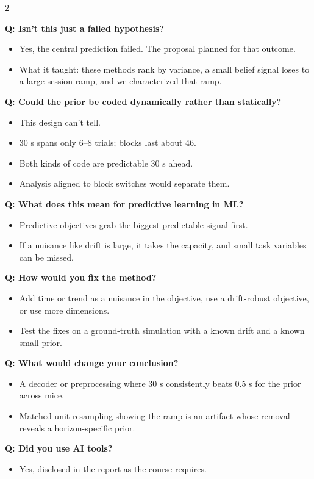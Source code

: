 \documentclass[10pt]{article}
\newcommand{\q}[2]{\par\smallskip\noindent\begin{minipage}{\linewidth}\raggedright{\bfseries\color{teal}Q: #1}\par\vspace{1pt}\begin{itemize}#2\end{itemize}\end{minipage}\par}
\begin{document}
\begin{multicols}{2}
\q{Isn't this just a failed hypothesis?}{
\item Yes, the central prediction failed. The proposal planned for that outcome.
\item What it taught: these methods rank by variance, a small belief signal loses to a large session ramp, and
we characterized that ramp.}

\q{Could the prior be coded dynamically rather than statically?}{
\item This design can't tell.
\item 30 s spans only 6--8 trials; blocks last about 46.
\item Both kinds of code are predictable 30 s ahead.
\item Analysis aligned to block switches would separate them.}

\q{What does this mean for predictive learning in ML?}{
\item Predictive objectives grab the biggest predictable signal first.
\item If a nuisance like drift is large, it takes the capacity, and small task variables can be missed.}

\q{How would you fix the method?}{
\item Add time or trend as a nuisance in the objective, use a drift-robust objective, or use more dimensions.
\item Test the fixes on a ground-truth simulation with a known drift and a known small prior.}

\q{What would change your conclusion?}{
\item A decoder or preprocessing where 30 s consistently beats 0.5 s for the prior across mice.
\item Matched-unit resampling showing the ramp is an artifact whose removal reveals a horizon-specific prior.}

\q{Did you use AI tools?}{
\item Yes, disclosed in the report as the course requires.}

\end{multicols}
\end{document}
